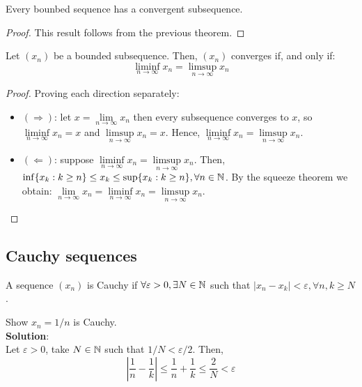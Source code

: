 \begin{theorem}
    Every bounbed sequence has a convergent subsequence.
\end{theorem}

\begin{proof}
    This result follows from the previous theorem.
\end{proof}

\begin{theorem}
    Let $(x_n)$ be a bounded subsequence. Then, $(x_n)$ converges if, and only if:
    \begin{equation*}
        \liminf \limits_{n \to \infty} x_n = \limsup \limits_{n \to \infty} x_n
    \end{equation*}
\end{theorem}

\begin{proof}
    Proving each direction separately:
    \begin{itemize}
        \item $(\Longrightarrow)$: let $x = \lim \limits_{n \to \infty} x_n$ then every subsequence converges to $x$, so $\liminf \limits_{n \to \infty} x_n = x$ and $\limsup \limits_{n \to \infty} x_n = x$. Hence, $\liminf \limits_{n \to \infty} x_n = \limsup \limits_{n \to \infty} x_n$.
        \item $(\Longleftarrow)$: suppose $\liminf \limits_{n \to \infty} x_n= \limsup \limits_{n \to \infty} x_n$. Then, $\inf \{ x_k: k \geq n\} \leq x_k \leq \sup \{x_k: k \geq n\}, \forall n \in \mathbb{N}$. By the squeeze theorem we obtain: $\lim \limits_{n \to \infty} x_n  = \liminf \limits_{n \to \infty} x_n = \limsup \limits_{n \to \infty} x_n$.
    \end{itemize}
\end{proof}

\subsection{Cauchy sequences}

\begin{definition}
    A sequence $(x_n)$ is Cauchy if $\forall \varepsilon > 0, \exists N \in \mathbb{N}$ such that $|x_n-x_k| < \varepsilon, \forall n,k \geq N$.
\end{definition}

\begin{eg}
    Show $x_n = 1/n$ is Cauchy. \\
    \textbf{Solution}: \\
    Let $\varepsilon > 0$, take $N \in \mathbb{N}$ such that $1/N < \varepsilon/2$. Then,
    \begin{equation*}
        \left |
            \frac{1}{n} - \frac{1}{k}
        \right | \leq
        \frac{1}{n} + \frac{1}{k} \leq
        \frac{2}{N} < \varepsilon
    \end{equation*} 
\end{eg}

